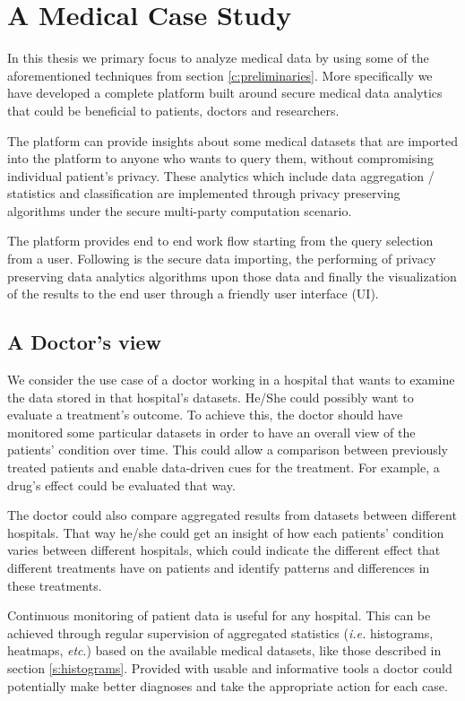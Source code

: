 \chapter{A Medical Case Study}\label{c:medical-study}

In this thesis we primary focus to analyze medical data by using some of the aforementioned techniques from section \ref{c:preliminaries}.
More specifically we have developed a complete platform built around secure medical data analytics that could be beneficial to patients, doctors and researchers.

The platform can provide insights about some medical datasets that are imported into the platform to anyone who wants to query them, without compromising individual patient's privacy.
These analytics which include data aggregation / statistics and classification are implemented through privacy preserving algorithms under the secure multi-party computation scenario.

The platform provides end to end work flow starting from the query selection from a user.
Following is the secure data importing, the performing of privacy preserving data analytics algorithms upon those data and finally the visualization of the results to the end user through a friendly user interface (UI).

\section{A Doctor's view}
We consider the use case of a doctor working in a hospital that wants to examine the data stored in that hospital's datasets.
He/She could possibly want to evaluate a treatment's outcome.
To achieve this, the doctor should have monitored some particular datasets in order to have an overall view of the patients' condition over time.
This could allow a comparison between previously treated patients and enable data-driven cues for the treatment.
For example, a drug's effect could be evaluated that way.

The doctor could also compare aggregated results from datasets between different hospitals.
That way he/she could get an insight of how each patients' condition varies between different hospitals, which could indicate the different effect that different treatments have on patients and identify patterns
and differences in these treatments.

Continuous monitoring of patient data is useful for any hospital.
This can be achieved through regular supervision of aggregated statistics (\textit{i.e.} histograms, heatmaps, \textit{etc}.) based on the available medical datasets, like those described in section \ref{s:histograms}.
Provided with usable and informative tools a doctor could potentially make better diagnoses and take the appropriate action for each case.


